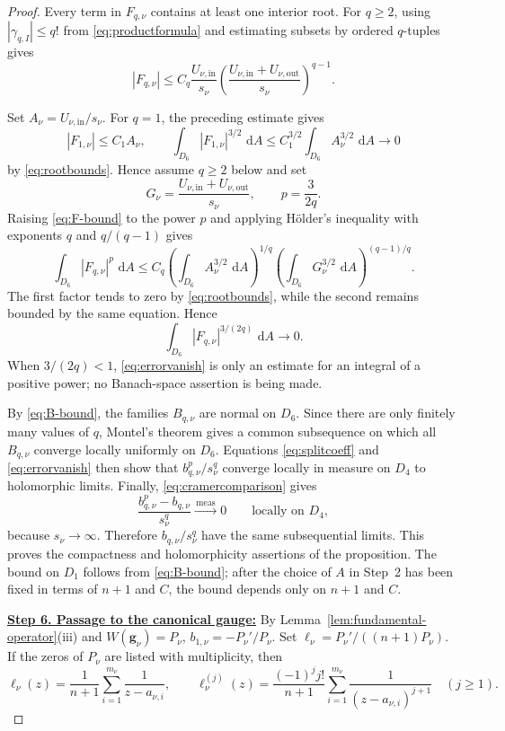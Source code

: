 \documentclass[12pt,letterpaper,reqno]{amsart}
\theoremstyle{definition}
\numberwithin{equation}{section}
\newcommand{\dA}{\,\mathrm dA}
\newcommand{\convmeas}{\xrightarrow{\,\mathrm{meas}\,}}
\newcommand{\gv}{\bm g}
\begin{document}
\begin{proof}
Every term in \(F_{q,\nu}\) contains at least one interior root.
For \(q\ge2\), using \(|\gamma_{q,I}|\leq q!\) from
\eqref{eq:productformula} and estimating subsets by ordered
\(q\)-tuples gives
\begin{equation}\label{eq:F-bound}
 |F_{q,\nu}|
 \leq
 C_q
 \frac{U_{\nu,\mathrm{in}}}{s_\nu}
 \left(
 \frac{U_{\nu,\mathrm{in}}+U_{\nu,\mathrm{out}}}{s_\nu}
 \right)^{q-1}.
\end{equation}

Set \(A_\nu=U_{\nu,\mathrm{in}}/s_\nu\). For \(q=1\), the preceding
estimate gives
\[
 |F_{1,\nu}|\le C_1A_\nu,
 \qquad
 \int_{D_6}|F_{1,\nu}|^{3/2}\,\dA
 \le C_1^{3/2}\int_{D_6}A_\nu^{3/2}\,\dA
 \longrightarrow0
\]
by \eqref{eq:rootbounds}. Hence assume \(q\ge2\) below and set
\[
G_\nu=\frac{U_{\nu,\mathrm{in}}+U_{\nu,\mathrm{out}}}{s_\nu},
\qquad p=\frac{3}{2q}.
\]
Raising \eqref{eq:F-bound} to the power \(p\) and applying H\"older's
inequality with exponents \(q\) and \(q/(q-1)\) gives
\[
 \int_{D_6}|F_{q,\nu}|^p\,\dA
 \leq
 C_q
 \left(
 \int_{D_6}A_\nu^{3/2}\,\dA
 \right)^{1/q}
 \left(
 \int_{D_6}G_\nu^{3/2}\,\dA
 \right)^{(q-1)/q}.
\]
The first factor tends to zero by \eqref{eq:rootbounds}, while the
second remains bounded by the same equation. Hence
\begin{equation}\label{eq:errorvanish}
 \int_{D_6}|F_{q,\nu}|^{3/(2q)}\,\dA
 \longrightarrow0.
\end{equation}
When \(3/(2q)<1\), \eqref{eq:errorvanish} is only an estimate for an
integral of a positive power; no Banach-space assertion is being made.

By \eqref{eq:B-bound}, the families \(B_{q,\nu}\) are normal on
\(D_6\). Since there are only finitely many values of \(q\), Montel's
theorem gives a common subsequence on which all \(B_{q,\nu}\)
converge locally uniformly on \(D_6\). Equations
\eqref{eq:splitcoeff} and \eqref{eq:errorvanish} then show that
\(b_{q,\nu}^p/s_\nu^q\) converge locally in measure on \(D_4\) to
holomorphic limits. Finally, \eqref{eq:cramercomparison} gives
\[
 \frac{b_{q,\nu}^p-b_{q,\nu}}{s_\nu^q}
 \convmeas0
 \qquad\text{locally on }D_4,
\]
because \(s_\nu\to\infty\). Therefore
\(b_{q,\nu}/s_\nu^q\) have the same subsequential limits. This proves
the compactness and holomorphicity assertions of the proposition.
The bound on \(D_1\) follows from \eqref{eq:B-bound}; after the choice
of \(A\) in Step~2 has been fixed in terms of \({n+1}\) and \(C\), the
bound depends only on \({n+1}\) and \(C\).


\medskip\noindent
\textbf{\underline{Step 6. Passage to the canonical gauge:}}
By Lemma~\ref{lem:fundamental-operator}(iii) and
\(W(\gv_\nu)=P_\nu\),
\(b_{1,\nu}=-P_\nu'/P_\nu\).
Set
\(\ell_\nu=P_\nu'/((n+1)P_\nu)\).
If the zeros of \(P_\nu\) are listed with multiplicity, then
\[
 \ell_\nu(z)
 =
 \frac1{n+1}\sum_{i=1}^{m_\nu}\frac1{z-a_{\nu,i}},
 \qquad
 \ell_\nu^{(j)}(z)
 =
 \frac{(-1)^j j!}{{n+1}}
 \sum_{i=1}^{m_\nu}
 \frac1{(z-a_{\nu,i})^{j+1}}
 \quad(j\geq1).
\]


\end{proof}
\end{document}
